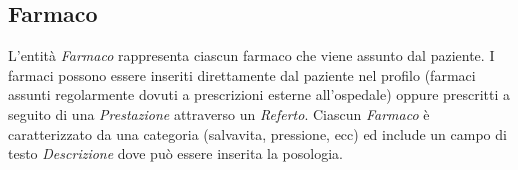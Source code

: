 \documentclass[paper=a4, fontsize=11pt,x11names]{report}
\begin{document}
\subsection{Farmaco}
\begin{center}
\vspace{0.5cm}
\vspace{0.5cm}
\end{center}
L'entità \textit{Farmaco} rappresenta ciascun farmaco che viene assunto dal paziente. I farmaci possono essere inseriti direttamente dal paziente nel profilo (farmaci assunti regolarmente dovuti a prescrizioni esterne all'ospedale) oppure prescritti a seguito di una \textit{Prestazione} attraverso un \textit{Referto}. Ciascun \textit{Farmaco} è caratterizzato da una categoria (salvavita, pressione, ecc) ed include un campo di testo \textit{Descrizione} dove può essere inserita la posologia.
\end{document}
